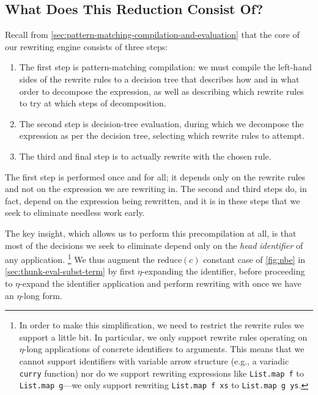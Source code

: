 
\subsection{What Does This Reduction Consist Of?}\label{sec:rewriting-more:prereduction:what-reduction}
Recall from \autoref{sec:pattern-matching-compilation-and-evaluation} that the core of our rewriting engine consists of three steps:
\begin{enumerate}
\item
  The first step is pattern-matching compilation: we must compile the left-hand sides of the rewrite rules to a decision tree that describes how and in what order to decompose the expression, as well as describing which rewrite rules to try at which steps of decomposition.
\item
  The second step is decision-tree evaluation, during which we decompose the expression as per the decision tree, selecting which rewrite rules to attempt.
\item
  The third and final step is to actually rewrite with the chosen rule.
\end{enumerate}
The first step is performed once and for all; it depends only on the rewrite rules and not on the expression we are rewriting in.
The second and third steps do, in fact, depend on the expression being rewritten, and it is in these steps that we seek to eliminate needless work early.

The key insight, which allows us to perform this precompilation at all, is that most of the decisions we seek to eliminate depend only on the \emph{head identifier} of any application.%
\footnote{%
  In order to make this simplification, we need to restrict the rewrite rules we support a little bit.
  In particular, we only support rewrite rules operating on $\eta$-long applications of concrete identifiers to arguments.
  This means that we cannot support identifiers with variable arrow structure (e.g., a variadic \texttt{curry} function) nor do we support rewriting expressions like \texttt{List.map f} to \texttt{List.map g}---we only support rewriting \texttt{List.map f xs} to \texttt{List.map g ys}.%
}
We thus augment the $\text{reduce}(c)$ constant case of \autoref{fig:nbe} in \autoref{sec:thunk-eval-subst-term} by first $\eta$-expanding the identifier, before proceeding to $\eta$-expand the identifier application and perform rewriting with  once we have an $\eta$-long form.

